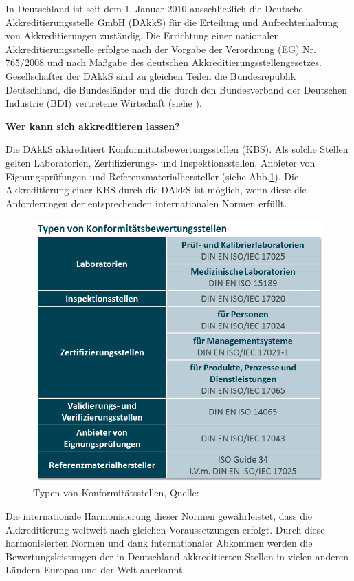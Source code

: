 In Deutschland ist seit dem 1. Januar 2010 ausschließlich die Deutsche Akkreditierungsstelle GmbH (DAkkS) für die Erteilung und Aufrechterhaltung von Akkreditierungen zuständig. Die Errichtung einer nationalen Akkreditierungsstelle erfolgte nach der Vorgabe der Verordnung (EG) Nr. 765/2008 und nach Maßgabe des deutschen Akkreditierungsstellengesetzes.
Gesellschafter der DAkkS sind zu gleichen Teilen die Bundesrepublik Deutschland, die Bundesländer und die durch den Bundesverband der Deutschen Industrie (BDI) vertretene Wirtschaft (siehe \cite{DAkkS}).

\textbf{Wer kann sich akkreditieren lassen?}

Die DAkkS akkreditiert Konformitätsbewertungsstellen (KBS). Als solche Stellen gelten Laboratorien, Zertifizierungs- und Inspektionsstellen, Anbieter von Eignungsprüfungen und Referenzmaterialhersteller (siehe Abb.\ref*{fig:Typen_von_KBA}).  
Die Akkreditierung einer KBS durch die DAkkS ist möglich, wenn diese die Anforderungen der entsprechenden internationalen Normen erfüllt.
\begin{figure}[!htp]
	\begin{center}
		\includegraphics[width=120mm]{12_vorlesung/media/TypenKBS.png}
		\caption{Typen von Konformitätsstellen, Quelle:\cite{DAkkS} }
		\label{fig:Typen_von_KBA}
	\end{center}
\end{figure}

Die internationale Harmonisierung dieser Normen gewährleistet, dass die Akkreditierung weltweit nach gleichen Voraussetzungen erfolgt. Durch diese harmonisierten Normen und dank internationaler Abkommen werden die Bewertungsleistungen der in Deutschland akkreditierten Stellen in vielen anderen Ländern Europas und der Welt anerkannt.

